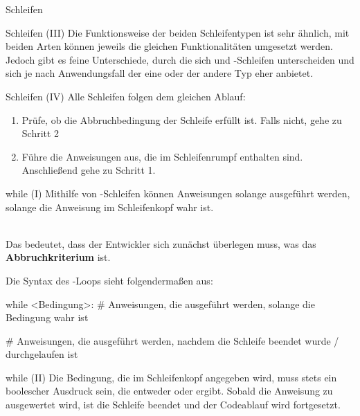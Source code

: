 \begin{subsection}{Schleifen}
\begin{frame}[fragile]{Schleifen (III)}
            Die Funktionsweise der beiden Schleifentypen ist sehr ähnlich, mit beiden Arten können jeweils die gleichen Funktionalitäten umgesetzt werden. Jedoch gibt es feine Unterschiede, durch die sich  und -Schleifen unterscheiden und sich je nach Anwendungsfall der eine oder der andere Typ eher anbietet.
        \end{frame}
        
        \begin{frame}[fragile]{Schleifen (IV)}
            Alle Schleifen folgen dem gleichen Ablauf:
                
                \begin{enumerate}
                    \item Prüfe, ob die Abbruchbedingung der Schleife erfüllt ist. Falls nicht, gehe zu Schritt 2
                    \item Führe die Anweisungen aus, die im Schleifenrumpf enthalten sind. Anschließend gehe zu Schritt 1.
                \end{enumerate}
        \end{frame}
        
        
        
        \begin{frame}[fragile]{while (I)}
            Mithilfe von -Schleifen können Anweisungen solange ausgeführt werden, solange die Anweisung im Schleifenkopf wahr ist. \\~\
            
            Das bedeutet, dass der Entwickler sich zunächst überlegen muss, was das \textbf{Abbruchkriterium} ist.
            
            Die Syntax des -Loops sieht folgendermaßen aus:
            
\begin{pythoncode}
while <Bedingung>:
    # Anweisungen, die ausgeführt werden, solange die Bedingung wahr ist

# Anweisungen, die ausgeführt werden, nachdem die Schleife beendet wurde / durchgelaufen ist
\end{pythoncode}
        \end{frame}
        
        \begin{frame}{while (II)}
            Die Bedingung, die im Schleifenkopf angegeben wird, muss stets ein boolescher Ausdruck sein, die entweder  oder  ergibt. Sobald die Anweisung zu  ausgewertet wird, ist die Schleife beendet und der Codeablauf wird fortgesetzt. \\~\
            

\end{frame}
\end{subsection}
